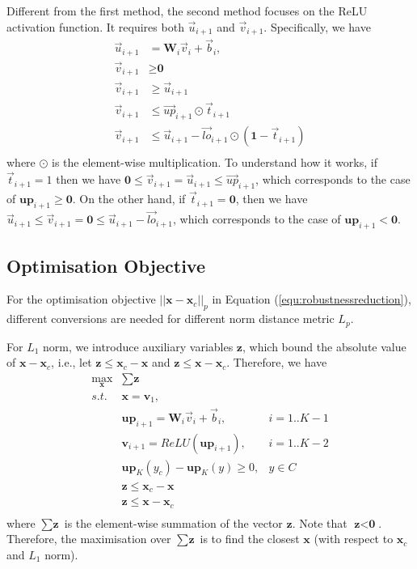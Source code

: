 Different from the first method, the second method focuses on the ReLU activation function. It requires both $\vec{u}_{i+1}$ and $\vec{v}_{i+1}$.
Specifically, we have 
\begin{equation}\label{equ:methodtwo}
    \begin{array}{ll}
    \vec{u}_{i+1} & = \textbf{W}_i \vec{v}_i + \vec{b}_i,  \\
    \vec{v}_{i+1} & \geq \textbf{0} \\
    \vec{v}_{i+1} & \geq \vec{u}_{i+1} \\
    \vec{v}_{i+1} & \leq \vec{up}_{i+1} \odot \vec{t}_{i+1} \\
    \vec{v}_{i+1} & \leq \vec{u}_{i+1} - \vec{lo}_{i+1} \odot (\textbf{1}-\vec{t}_{i+1}) \\
    \end{array}
\end{equation}
where $\odot$ is the element-wise multiplication. 
To understand how it works, if $\vec{t}_{i+1}=1$ then we have $\textbf{0}  \leq \vec{v}_{i+1}=\vec{u}_{i+1} \leq \vec{up}_{i+1}$, which corresponds to the case of $\textbf{up}_{i+1}\geq \textbf{0}$. On the other hand, if $\vec{t}_{i+1}=\textbf{0}$, then we have $\vec{u}_{i+1} \leq \vec{v}_{i+1}=\textbf{0} \leq  \vec{u}_{i+1} - \vec{lo}_{i+1}$, which corresponds to the case of $\textbf{up}_{i+1}< \textbf{0}$. 


\subsection*{Optimisation Objective}

For the optimisation objective $||\textbf{x} - \textbf{x}_c||_p $ in Equation (\ref{equ:robustnessreduction}),  different conversions are needed for different norm distance metric $L_p$. 

For $L_1$ norm, we introduce auxiliary variables $\textbf{z}$, which bound the absolute value of $\textbf{x} - \textbf{x}_c$, i.e., let $\textbf{z} \leq \textbf{x}_c - \textbf{x}$ and $\textbf{z} \leq \textbf{x} - \textbf{x}_c$. Therefore, we have 
\begin{equation}
\begin{array}{rll}
  \displaystyle\max_{\textbf{x}}  &   \displaystyle  \sum \textbf{z} & \\
    s.t. &  \textbf{x} = \textbf{v}_1, & \\
    & \textbf{up}_{i+1} =  \textbf{W}_i \vec{v}_{i} + \vec{b}_i, & i = 1..K-1\\
    & \textbf{v}_{i+1} = ReLU(\textbf{up}_{i+1}),  & i = 1..K-2 \\
    &  \textbf{up}_{K}(y_c) - \textbf{up}_{K}(y)\geq 0,  & y\in C \\
    & \textbf{z} \leq \textbf{x}_c - \textbf{x} & \\
    & \textbf{z} \leq \textbf{x} - \textbf{x}_c & \\
\end{array}
\end{equation}
where $\sum \textbf{z}$ is the element-wise summation of the vector $\textbf{z}$. 
Note that $\textbf{z}<\textbf{0}$. Therefore, the maximisation over $\sum \textbf{z}$ is to find the closest $\textbf{x}$ (with respect to $\textbf{x}_c$ and $L_1$ norm).  

